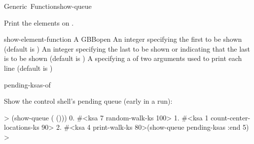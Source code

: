 \documentclass[10pt,twoside,english,pdftex]{article}
\begin{document}
\begin{functiondoc}{Generic~Function}{show-queue}{
    }
%
%
%

\fnsyntax

\fnpurpose Print the elements on .

\fnmethods
{}

\fnpackage {}

\fnmodule {}

\fnargs
\begin{args}{show-element-function}
\arg[queue] A GBBopen 
\arg[start] An integer specifying the first  to
be shown (default is )
\arg[end] An integer specifying the last  to
be shown or \nil{} indicating that the last  is
to be shown (default is \nil) 
 A  specifying a
 of two arguments used to print each
 line (default is
)
\end{args}

\begin{alsos}{pending-ksas-of}
\also[queue]
\also[on-queue-p]
\end{alsos}

\fnexample
%
%
%
%
%
Show the control shell's pending  queue (early in a
 run):
%
\W\supp
\begin{example}
  >  (show-queue ( ()))
      0. #<ksa 7 random-walk-ks 100>
      1. #<ksa 1 count-center-locations-ks 90>
      2. #<ksa 4 print-walk-ks 80>(show-queue pending-ksas :end 5)
  >
\end{example}

\end{functiondoc}

\end{document}
